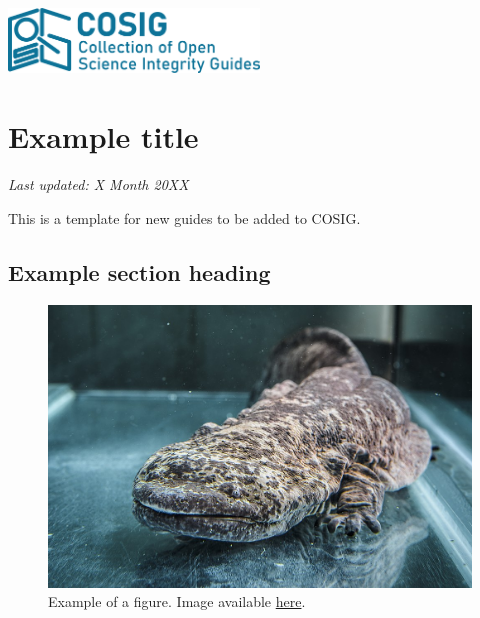 \documentclass[letterpaper, 12pt]{article}
\begin{document}
\flushleft
\includegraphics[width=0.5\textwidth]{img/home/241017_final_logo_mockup.png}

\section*{Example title}
\textit{Last updated: X Month 20XX}

This is a template for new guides to be added to COSIG.

\subsection*{Example section heading}

\begin{figure}[h!tbp]
    \includegraphics[width=\textwidth]{img/home/chinese_giant_salamander.jpg}
    \caption*{Example of a figure. Image available \href{https://commons.wikimedia.org/wiki/File:Velemlok_\%C4\%8D\%C3\%ADnsk\%C3\%BD_zoo_praha_1.jpg}{here}.}
\end{figure}

\end{document}
